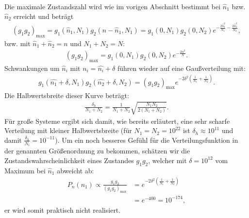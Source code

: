 Die maximale Zustandszahl wird \textendash{} wie im vorigen Abschnitt bestimmt \textendash{} bei $\hat{n}_1$ bzw. $\hat{n}_2$ erreicht und beträgt 
\begin{align*}
    (g_1g_2)_\mathrm{max} = g_1(\hat{n}_1,N_1)g_2(n-\hat{n}_1,N_1) = g_1(0,N_1)g_2(0,N_2) e^{-\frac{2\hat{n}_1^2}{N_1}-\frac{2\hat{n}_2^2}{N_2}},
\end{align*}
bzw. mit $\hat{n}_1+\hat{n}_2=n$ und $N_1+N_2=N$:
\begin{align*}
    (g_1g_2)_\mathrm{max} = g_1(0,N_1)g_2(0,N_2) e^{-\frac{2n^2}{N}}. 
\end{align*}
Schwankungen um $\hat{n}_i$ mit $n_i=\hat{n_i}+\delta$ führen wieder auf eine Gaußverteilung mit:
\begin{align*}
    g_1(\hat{n_1}+\delta,N_1)g_2(\hat{n_2}+\delta,N_2)=(g_1g_2)_\mathrm{max}e^{-2\delta^2 (\frac{1}{N_1}+\frac{1}{N_2})}. 
\end{align*}
Die Halbwertsbreite dieser Kurve beträgt:
\begin{align*}
    \frac{\delta_h}{N_1+N_2}=\frac{1}{N_1+N_2}\sqrt{\frac{N_1N_2}{2(N_1+N_2)}}. 
\end{align*}
Für große Systeme ergibt sich damit, wie bereits erläutert, eine sehr scharfe Verteilung mit kleiner Halbwertsbreite (für $N_1=N_2=10^{22}$ ist $\delta_h\approx 10^{11}$ und damit $\frac{\delta_h}{N_i}=10^{-11}$). Um ein noch besseres Gefühl für die Verteilungsfunktion in der genannten Größenordnung zu bekommen, schätzen wir die Zustandswahrscheinlichkeit eines Zustandes $g_1g_2$, welcher mit $\delta=10^{12}$ vom Maximum bei $\hat{n}_1$ abweicht ab:
\begin{align*}
    P_n(n_1)\propto\frac{g_1g_2}{(g_1g_2)_\mathrm{max}}&=e^{-2\delta^2(\frac{1}{N_1}+\frac{1}{N_2})}\\&=e^{-400}=10^{-174},
\end{align*}
er wird somit praktisch nicht realisiert. 


